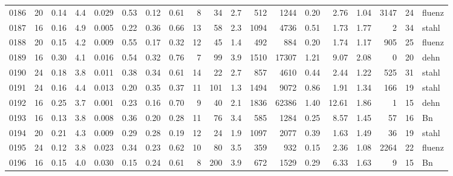 {\begin{longtable}{@{}lrrrrrrrrrrrrrrrrrl@{}}
0186 & 20 & \num{0.14} & \num{4.4} & \num{0.029} & \num{0.53} & \num{0.12} & \num{0.61} & 8 & \num{34} & \num{2.7} & \num{512} & \num{1244} & \num{0.20} & \num{2.76} & \num{1.04} & \num{3147} & \num{24} & fluenz \\
0187 & 16 & \num{0.16} & \num{4.9} & \num{0.005} & \num{0.22} & \num{0.36} & \num{0.66} & 13 & \num{58} & \num{2.3} & \num{1094} & \num{4736} & \num{0.51} & \num{1.73} & \num{1.77} & \num{2} & \num{34} & stahl \\
0188 & 20 & \num{0.15} & \num{4.2} & \num{0.009} & \num{0.55} & \num{0.17} & \num{0.32} & 12 & \num{45} & \num{1.4} & \num{492} & \num{884} & \num{0.20} & \num{1.74} & \num{1.17} & \num{905} & \num{25} & fluenz \\
0189 & 16 & \num{0.30} & \num{4.1} & \num{0.016} & \num{0.54} & \num{0.32} & \num{0.76} & 7 & \num{99} & \num{3.9} & \num{1510} & \num{17307} & \num{1.21} & \num{9.07} & \num{2.08} & \num{0} & \num{20} & dehn \\
0190 & 24 & \num{0.18} & \num{3.8} & \num{0.011} & \num{0.38} & \num{0.34} & \num{0.61} & 14 & \num{22} & \num{2.7} & \num{857} & \num{4610} & \num{0.44} & \num{2.44} & \num{1.22} & \num{525} & \num{31} & stahl \\
0191 & 24 & \num{0.16} & \num{4.4} & \num{0.013} & \num{0.20} & \num{0.35} & \num{0.37} & 11 & \num{101} & \num{1.3} & \num{1494} & \num{9072} & \num{0.86} & \num{1.91} & \num{1.34} & \num{166} & \num{19} & stahl \\
0192 & 16 & \num{0.25} & \num{3.7} & \num{0.001} & \num{0.23} & \num{0.16} & \num{0.70} & 9 & \num{40} & \num{2.1} & \num{1836} & \num{62386} & \num{1.40} & \num{12.61} & \num{1.86} & \num{1} & \num{15} & dehn \\
0193 & 16 & \num{0.13} & \num{3.8} & \num{0.008} & \num{0.36} & \num{0.20} & \num{0.28} & 11 & \num{76} & \num{3.4} & \num{585} & \num{1284} & \num{0.25} & \num{8.57} & \num{1.45} & \num{57} & \num{16} & Bn \\
0194 & 20 & \num{0.21} & \num{4.3} & \num{0.009} & \num{0.29} & \num{0.28} & \num{0.19} & 12 & \num{24} & \num{1.9} & \num{1097} & \num{2077} & \num{0.39} & \num{1.63} & \num{1.49} & \num{36} & \num{19} & stahl \\
0195 & 24 & \num{0.12} & \num{3.8} & \num{0.023} & \num{0.34} & \num{0.23} & \num{0.62} & 10 & \num{80} & \num{3.5} & \num{359} & \num{932} & \num{0.15} & \num{2.36} & \num{1.08} & \num{2264} & \num{22} & fluenz \\
0196 & 16 & \num{0.15} & \num{4.0} & \num{0.030} & \num{0.15} & \num{0.24} & \num{0.61} & 8 & \num{200} & \num{3.9} & \num{672} & \num{1529} & \num{0.29} & \num{6.33} & \num{1.63} & \num{9} & \num{15} & Bn \\

\end{longtable}}
